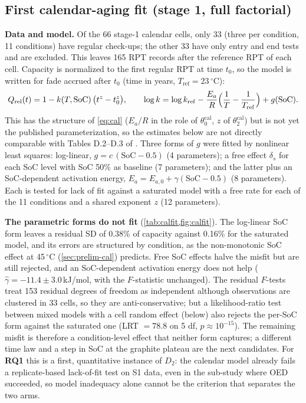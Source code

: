 \documentclass[11pt,letterpaper]{article}
\newcommand{\RQ}[1]{\textbf{RQ#1}}
\begin{document}
\subsection{First calendar-aging fit (stage 1, full factorial)}\label{sec:prelim-calfit}
\textbf{Data and model.} Of the 66 stage-1 calendar cells, only 33 (three per condition, 11 conditions) have regular check-ups; the other 33 have only entry and end tests and are excluded. This leaves 165 RPT records after the reference RPT of each cell. Capacity is normalized to the first regular RPT at time $t_0$, so the model is written for fade accrued after $t_0$ (time in years, $T_{\mathrm{ref}}=23\,^\circ$C):
\begin{equation}\label{eq:calfit}
Q_{\mathrm{rel}}(t)=1-k(T,\mathrm{SoC})\,\bigl(t^{z}-t_0^{z}\bigr),\qquad
\log k=\log k_{\mathrm{ref}}-\frac{E_a}{R}\Bigl(\frac1T-\frac1{T_{\mathrm{ref}}}\Bigr)+g(\mathrm{SoC}).
\end{equation}
This has the structure of \eqref{eq:cal} ($E_a/R$ in the role of $\theta_0^{\mathrm{cal}}$, $z$ of $\theta_2^{\mathrm{cal}}$) but is not yet the published parameterization, so the estimates below are not directly comparable with Tables D.2--D.3 of \cite{stroebl2026}. Three forms of $g$ were fitted by nonlinear least squares: log-linear, $g=c\,(\mathrm{SoC}-0.5)$ (4 parameters); a free effect $\delta_s$ for each SoC level with SoC 50\% as baseline (7 parameters); and the latter plus an SoC-dependent activation energy, $E_a=E_{a,0}+\gamma(\mathrm{SoC}-0.5)$ (8 parameters). Each is tested for lack of fit against a saturated model with a free rate for each of the 11 conditions and a shared exponent $z$ (12 parameters).

\textbf{The parametric forms do not fit} (\cref{tab:calfit,fig:calfit}). The log-linear SoC form leaves a residual SD of 0.38\% of capacity against 0.16\% for the saturated model, and its errors are structured by condition, as the non-monotonic SoC effect at 45\,$^\circ$C (\cref{sec:prelim-cal}) predicts. Free SoC effects halve the misfit but are still rejected, and an SoC-dependent activation energy does not help ($\hat\gamma=-11.4\pm3.0$\,kJ/mol, with the $F$-statistic unchanged). The residual $F$-tests treat 153 residual degrees of freedom as independent although observations are clustered in 33 cells, so they are anti-conservative; but a likelihood-ratio test between mixed models with a cell random effect (below) also rejects the per-SoC form against the saturated one (LRT $=78.8$ on 5 df, $p\approx10^{-15}$). The remaining misfit is therefore a condition-level effect that neither form captures; a different time law and a step in SoC at the graphite plateau are the next candidates. For \RQ1 this is a first, quantitative instance of $D_2$: the calendar model already fails a replicate-based lack-of-fit test on S1 data, even in the sub-study where OED succeeded, so model inadequacy alone cannot be the criterion that separates the two arms.
\end{document}
